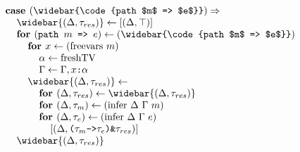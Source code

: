\documentclass[acmsmall]{acmart}
\begin{document}
\begin{figure*}[h]
\[\begin{array}[t]{@{} l}
    \I \B{case } (\widebar{\code{path $m$ => $e$}})  \Rightarrow  
    \\
    \I\I \widebar{(\Delta, \tau_{res})} \leftarrow [(\Delta, \top)]
    \\
    \I\I \B{for } (\code{path $m$ => $e$}) \leftarrow (\widebar{\code{path $m$ => $e$}}) 
    \\
    \I\I\I \B{for } x \leftarrow (\F{freevars } m)
    \\
    \I\I\I\I \alpha \leftarrow \F{freshTV} 
    \\
    \I\I\I\I \Gamma \leftarrow \Gamma, \code{$x$:$\alpha$}
    \\
    \I\I\I \widebar{(\Delta, \tau_{res})} \leftarrow
    \\
    \I\I\I\I \B{for } (\Delta, \tau_{res}) \leftarrow \widebar{(\Delta, \tau_{res})} 
    \\
    \I\I\I\I \B{for } (\Delta, \tau_{m}) \leftarrow (\F{infer } \Delta\ \Gamma\ m) 
    \\
    \I\I\I\I \B{for } (\Delta, \tau_{e}) \leftarrow (\F{infer } \Delta\ \Gamma\ e) 
    \\
    \I\I\I\I\I [(\Delta, \code{($\tau_{m}$->$\tau_{e}$)\&$\tau_{res}$})]
    \\
    \I\I \widebar{(\Delta, \tau_{res})}

    \\


\end{array}\]
\end{figure*}
\end{document}
